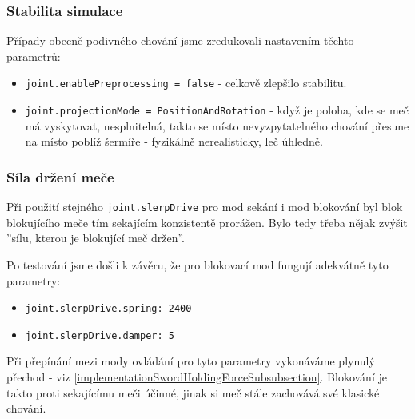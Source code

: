 \subsubsection*{Stabilita simulace}

Případy obecně podivného chování jsme zredukovali nastavením těchto parametrů:
\begin{itemize}
  \item \texttt{joint.enablePreprocessing = false} - celkově zlepšilo stabilitu.
  \item \texttt{joint.projectionMode = PositionAndRotation} - když je poloha, kde se meč má vyskytovat, nesplnitelná, takto se místo nevyzpytatelného chování přesune na místo poblíž šermíře - fyzikálně nerealisticky, leč úhledně.
\end{itemize}


\subsubsection*{Síla držení meče}

Při použití stejného \texttt{joint.slerpDrive} pro mod sekání i mod blokování byl blok blokujícího meče tím sekajícím konzistentě prorážen. Bylo tedy třeba nějak zvýšit ''sílu, kterou je blokující meč držen''. 

Po testování jsme došli k závěru, že pro blokovací mod fungují adekvátně tyto parametry:
\begin{itemize}
  \item \texttt{joint.slerpDrive.spring: 2400}
  \item \texttt{joint.slerpDrive.damper: 5}
\end{itemize}

Při přepínání mezi mody ovládání pro tyto parametry vykonáváme plynulý přechod - viz \ref{implementationSwordHoldingForceSubsubsection}. Blokování je takto proti sekajícímu meči účinné, jinak si meč stále zachovává své klasické chování.


\pagebreak


